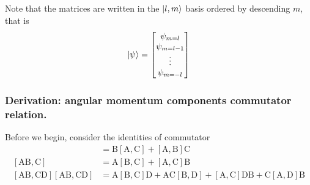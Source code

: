 \documentclass[../../../main.tex]{subfiles}
\begin{document}
Note that the matrices are written in the $\ket{l,m}$ basis ordered by descending $m$, that is
\begin{equation*}
    \ket{\psi} =
    \begin{bmatrix}
        \psi_{m=l} \\ \psi_{m=l-1} \\ \vdots \\ \psi_{m=-l}
    \end{bmatrix}
\end{equation*}

\subsubsection*{Derivation: angular momentum components commutator relation.}
Before we begin, consider the identities of commutator
\begin{align*}
    [\mathrm{A},\mathrm{B}\mathrm{C}] & =\mathrm{B}[\mathrm{A},\mathrm{C}]+[\mathrm{A},\mathrm{B}]\mathrm{C} \\
    [\mathrm{A}\mathrm{B},\mathrm{C}] & =\mathrm{A}[\mathrm{B},\mathrm{C}]+[\mathrm{A},\mathrm{C}]\mathrm{B} \\
    [\mathrm{A}\mathrm{B},\mathrm{C}\mathrm{D}]
    [\mathrm{A}\mathrm{B},\mathrm{C}\mathrm{D}]
                                      & = \mathrm{A}[\mathrm{B},\mathrm{C}]\mathrm{D}
    + \mathrm{A}\mathrm{C}[\mathrm{B},\mathrm{D}]
    + [\mathrm{A},\mathrm{C}]\mathrm{D}\mathrm{B}
    + \mathrm{C}[\mathrm{A},\mathrm{D}]\mathrm{B}
\end{align*}
\end{document}
